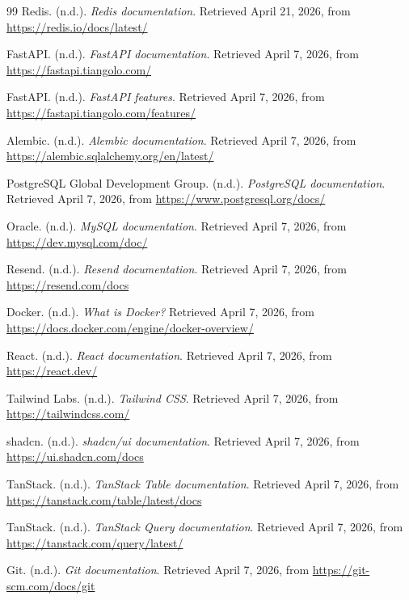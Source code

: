 \begin{thebibliography}{99}
	Redis. (n.d.). \textit{Redis documentation}. Retrieved April 21, 2026, from \url{https://redis.io/docs/latest/}
	
	FastAPI. (n.d.). \textit{FastAPI documentation}. Retrieved April 7, 2026, from \url{https://fastapi.tiangolo.com/}
	
	FastAPI. (n.d.). \textit{FastAPI features}. Retrieved April 7, 2026, from \url{https://fastapi.tiangolo.com/features/}
	
	Alembic. (n.d.). \textit{Alembic documentation}. Retrieved April 7, 2026, from \url{https://alembic.sqlalchemy.org/en/latest/}
	
	PostgreSQL Global Development Group. (n.d.). \textit{PostgreSQL documentation}. Retrieved April 7, 2026, from \url{https://www.postgresql.org/docs/}
	
	Oracle. (n.d.). \textit{MySQL documentation}. Retrieved April 7, 2026, from \url{https://dev.mysql.com/doc/}
	
	Resend. (n.d.). \textit{Resend documentation}. Retrieved April 7, 2026, from \url{https://resend.com/docs}
	
	Docker. (n.d.). \textit{What is Docker?} Retrieved April 7, 2026, from \url{https://docs.docker.com/engine/docker-overview/}
	
	React. (n.d.). \textit{React documentation}. Retrieved April 7, 2026, from \url{https://react.dev/}
	
	Tailwind Labs. (n.d.). \textit{Tailwind CSS}. Retrieved April 7, 2026, from \url{https://tailwindcss.com/}
	
	shadcn. (n.d.). \textit{shadcn/ui documentation}. Retrieved April 7, 2026, from \url{https://ui.shadcn.com/docs}
	
	TanStack. (n.d.). \textit{TanStack Table documentation}. Retrieved April 7, 2026, from \url{https://tanstack.com/table/latest/docs}
	
	TanStack. (n.d.). \textit{TanStack Query documentation}. Retrieved April 7, 2026, from \url{https://tanstack.com/query/latest/}
	
	Git. (n.d.). \textit{Git documentation}. Retrieved April 7, 2026, from \url{https://git-scm.com/docs/git}
	

\end{thebibliography}
